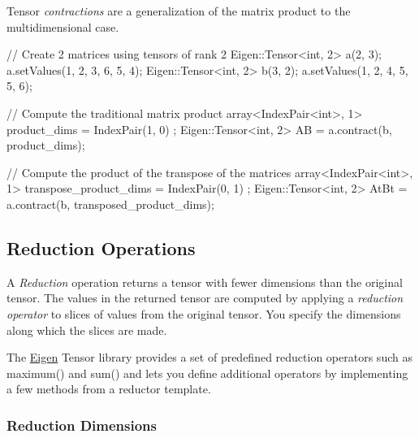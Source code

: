 Tensor {\itshape contractions} are a generalization of the matrix product to the multidimensional case. \begin{DoxyVerb}// Create 2 matrices using tensors of rank 2
Eigen::Tensor<int, 2> a(2, 3);
a.setValues({{1, 2, 3}, {6, 5, 4}});
Eigen::Tensor<int, 2> b(3, 2);
a.setValues({{1, 2}, {4, 5}, {5, 6}});

// Compute the traditional matrix product
array<IndexPair<int>, 1> product_dims = { IndexPair(1, 0) };
Eigen::Tensor<int, 2> AB = a.contract(b, product_dims);

// Compute the product of the transpose of the matrices
array<IndexPair<int>, 1> transpose_product_dims = { IndexPair(0, 1) };
Eigen::Tensor<int, 2> AtBt = a.contract(b, transposed_product_dims);
\end{DoxyVerb}


\subsection*{Reduction Operations}

A {\itshape Reduction} operation returns a tensor with fewer dimensions than the original tensor. The values in the returned tensor are computed by applying a {\itshape reduction operator} to slices of values from the original tensor. You specify the dimensions along which the slices are made.

The \hyperlink{namespace_eigen}{Eigen} Tensor library provides a set of predefined reduction operators such as {\ttfamily maximum()} and {\ttfamily sum()} and lets you define additional operators by implementing a few methods from a reductor template.

\subsubsection*{Reduction Dimensions}

